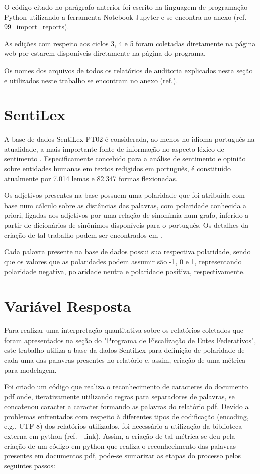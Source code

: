 O código citado no parágrafo anterior foi escrito na linguagem de programação Python utilizando a ferramenta Notebook Jupyter e se encontra no anexo (ref. - 99_import_reports).

As edições com respeito aos ciclos 3, 4 e 5 foram coletadas diretamente na página web por estarem disponíveis diretamente na página do programa.

Os nomes dos arquivos de todos os relatórios de auditoria explicados nesta seção e utilizados neste trabalho se encontram no anexo (ref.).

\section{SentiLex}
\label{sec:sentilex}

A base de dados SentiLex-PT02 é considerada, ao menos no idioma português na atualidade, a mais importante fonte de informação no aspecto léxico de sentimento \citep{BeckerTumitan2014}. Especificamente concebido para a análise de sentimento e opinião sobre entidades humanas em textos redigidos em português, é constituído atualmente por 7.014 lemas e 82.347 formas flexionadas.

Os adjetivos presentes na base possuem uma polaridade que foi atribuída com base num cálculo sobre as distâncias das palavras, com polaridade conhecida a priori, ligadas aos adjetivos por uma relação de sinonímia num grafo, inferido a partir de dicionários de sinônimos disponíveis para o português. Os detalhes da criação de tal trabalho podem ser encontrados em \citep{BeckerTumitan2014}.

Cada palavra presente na base de dados possui sua respectiva polaridade, sendo que os valores que as polaridades podem assumir são -1, 0 e 1, representando polaridade negativa, polaridade neutra e polaridade positiva, respectivamente.

\section{Variável Resposta}
\label{sec:variavel_resposta}

Para realizar uma interpretação quantitativa sobre os relatórios coletados que foram apresentados na seção do "Programa de Fiscalização de Entes Federativos", este trabalho utiliza a base da dados SentiLex para definição de polaridade de cada uma das palavras presentes no relatório e, assim, criação de uma métrica para modelagem.

Foi criado um código que realiza o reconhecimento de caracteres do documento pdf onde, iterativamente utilizando regras para separadores de palavras, se concatenou caracter a caracter formando as palavras do relatório pdf. Devido a problemas enfrentados com respeito à diferentes tipos de codificação (encoding, e.g., UTF-8) dos relatórios utilizados, foi necessário a utilização da biblioteca externa em python (ref. - link). Assim, a criação de tal métrica se deu pela criação de um código em python que realiza o reconhecimento das palavras presentes em documentos pdf, pode-se sumarizar as etapas do processo pelos seguintes passos:

